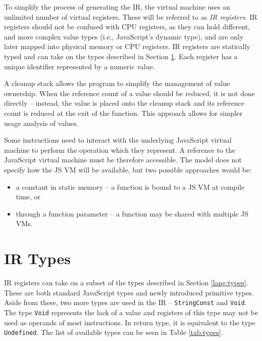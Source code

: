 To simplify the process of generating the IR, the virtual machine uses an unlimited number of virtual registers. These will be referred to as \textit{IR registers}. IR registers should not be confused with CPU registers, as they can hold different, and more complex value types (i.e., JavaScript's dynamic type), and are only later mapped into physical memory or CPU registers. IR registers are statically typed and can take on the types described in Section \ref{ir:types}. Each register has a unique identifier represented by a numeric value.

A cleanup stack allows the program to simplify the management of value ownership. When the reference count of a value should be reduced, it is not done directly -- instead, the value is placed onto the cleanup stack and its reference count is reduced at the exit of the function. This approach allows for simpler usage analysis of values.

Some instructions need to interact with the underlying JavaScript virtual machine to perform the operation which they represent. A reference to the JavaScript virtual machine must be therefore accessible. The model does not specify how the JS VM will be available, but two possible approaches would be:
\begin{itemize}
    \item a constant in static memory -- a function is bound to a JS VM at compile time, or
    \item through a function parameter -- a function may be shared with multiple JS VMs.
\end{itemize}


\section{IR Types}\label{ir:types}

IR registers can take on a subset of the types described in Section \ref{lang:types}. These are both standard JavaScript types and newly introduced primitive types. Aside from these, two more types are used in the IR -- \texttt{StringConst} and \texttt{Void}. The type \texttt{Void} represents the lack of a value and registers of this type may not be used as operands of most instructions. In return type, it is equivalent to the type \texttt{Undefined}. The list of available types can be seen in Table \ref{tab:types}.

